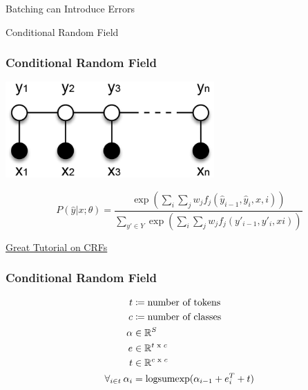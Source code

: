 \documentclass{beamer}
\def\R{\mathbb{R}}
\newcommand{\logsumexp}{\mathop{\rm logsumexp}}
\begin{document}
\begin{section}{Batching can Introduce Errors}
    \begin{subsection}{Conditional Random Field}

        \begin{frame}
            \frametitle{Conditional Random Field}

            \begin{center}
                \includegraphics[width=0.6\textwidth]{images/crf.png}
            \end{center}
            $$
                P(\hat{y}|x;\theta) = \frac{\exp(\sum_i \sum_j w_j f_j(\hat{y}_{i-1}, \hat{y}_i, x, i))}{\sum_{y' \in Y}\exp(\sum_i
                \sum_j w_j f_j(y'_{i - 1}, y'_i, x i))}
            $$
            \begin{center}
                \href{https://createmomo.github.io/2017/09/12/CRF_Layer_on_the_Top_of_BiLSTM_1/}{Great Tutorial on CRFs}
            \end{center}

        \end{frame}

        \begin{frame}
            \frametitle{Conditional Random Field}
            \begin{align*}
                t &\coloneqq \text{number of tokens} \\
                c &\coloneqq \text{number of classes} \\
                \alpha &\in \R^S \\
                e &\in \R^{t \text{ x } c} \\
                t &\in \R^{c \text{ x } c} \\
                \forall_{i \in t} \hspace{2pt} \alpha_i &= \logsumexp(\alpha_{i - 1} + e_i^T + t) \\
            \end{align*}


\end{frame}
\end{subsection}
\end{section}
\end{document}

